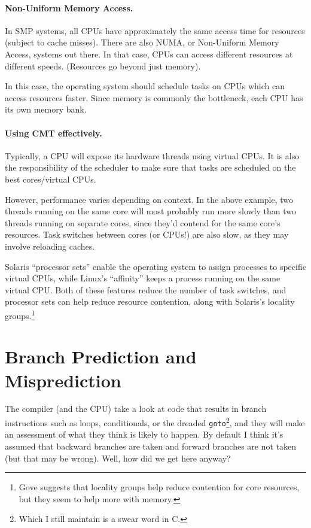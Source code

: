 \paragraph{Non-Uniform Memory Access.}
In SMP systems, all CPUs have approximately the same access time for resources
(subject to cache misses). There are also NUMA, or Non-Uniform Memory Access,
systems out there. In that case, CPUs can access different resources at different
speeds. (Resources go beyond just memory).

In this case, the operating system should schedule tasks on CPUs which
can access resources faster. Since memory is commonly the bottleneck,
each CPU has its own memory bank.

\paragraph{Using CMT effectively.} Typically, a CPU will expose its
hardware threads using virtual CPUs. It is also the responsibility of the scheduler
to make sure that tasks are scheduled on the best cores/virtual CPUs.

However, performance varies depending on context. In the above
example, two threads running on the same core will most probably run
more slowly than two threads running on separate cores, since they'd
contend for the same core's resources. Task switches between cores (or
CPUs!) are also slow, as they may involve reloading caches.

Solaris ``processor sets''
enable the operating system to assign processes to specific virtual CPUs,
while Linux's ``affinity'' keeps a process running on the same virtual CPU.
Both of these features reduce the number of task switches, and processor
sets can help reduce resource contention, along with Solaris's locality
groups.\footnote{Gove suggests that locality groups help reduce contention
for core resources, but they seem to help more with memory.}



\section*{Branch Prediction and Misprediction}

The compiler (and the CPU) take a look at code that results in branch instructions such as loops, conditionals, or the dreaded \texttt{goto}\footnote{Which I still maintain is a swear word in C.}, and they will make an assessment of what they think is likely to happen. By default I think it's assumed that backward branches are taken and forward branches are not taken (but that may be wrong). Well, how did we get here anyway?


